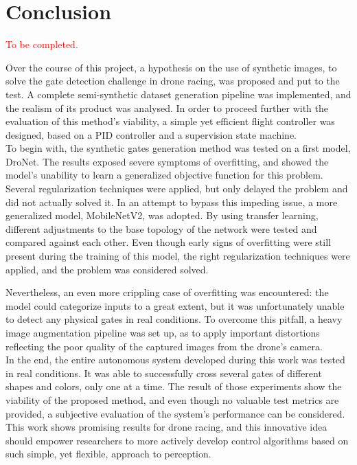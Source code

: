\chapter{Conclusion}

\textcolor{red}{To be completed.\\}

Over the course of this project, a hypothesis on the use of synthetic images,
to solve the gate detection challenge in drone racing, was proposed and put
to the test. A complete semi-synthetic dataset generation pipeline was
implemented, and the realism of its product was analysed. In order to proceed
further with the evaluation of this method's viability, a simple yet efficient
flight controller was designed, based on a PID controller and a supervision
state machine.\\

To begin with, the synthetic gates generation method was tested on a first
model, DroNet. The results exposed severe symptoms of overfitting, and showed
the model's unability to learn a generalized objective function for this
problem.  Several regularization techniques were applied, but only delayed the
problem and did not actually solved it. In an attempt to bypass this impeding
issue, a more generalized model, MobileNetV2, was adopted. By using transfer
learning, different adjustments to the base topology of the network were tested
and compared against each other. Even though early signs of overfitting were
still present during the training of this model, the right regularization
techniques were applied, and the problem was considered solved.

Nevertheless, an even more crippling case of overfitting was encountered: the
model could categorize inputs to a great extent, but it was unfortunately
unable to detect any physical gates in real conditions. To overcome this
pitfall, a heavy image augmentation pipeline was set up, as to apply important
distortions reflecting the poor quality of the captured images from the drone's
camera.\\

In the end, the entire autonomous system developed during this work was tested
in real conditions. It was able to successfully cross several gates of
different shapes and colors, only one at a time. The result of those
experiments show the viability of the proposed method, and even though no
valuable test metrics are provided, a subjective evaluation of the system's
performance can be considered. This work shows promising results for drone
racing, and this innovative idea should empower researchers to more actively
develop control algorithms based on such simple, yet flexible, approach to
perception.
